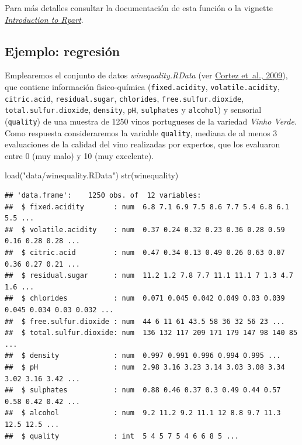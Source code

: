 \documentclass[
  spanish,
]{book}
\newenvironment{Shaded}{\begin{snugshade}}{\end{snugshade}}
\newcommand{\FunctionTok}[1]{\textcolor[rgb]{0.00,0.00,0.00}{#1}}
\newcommand{\NormalTok}[1]{#1}
\newcommand{\StringTok}[1]{\textcolor[rgb]{0.31,0.60,0.02}{#1}}
\theoremstyle{break}
\theoremstyle{definition}
\theoremstyle{definition}
\theoremstyle{definition}
\theoremstyle{definition}
\theoremstyle{remark}
\begin{document}
Para más detalles consultar la documentación de esta función o la vignette \href{https://cran.r-project.org/web/packages/rpart/vignettes/longintro.pdf}{\emph{Introduction to Rpart}}.

\hypertarget{ejemplo-regresiuxf3n}{%
\subsection{Ejemplo: regresión}\label{ejemplo-regresiuxf3n}}

Emplearemos el conjunto de datos \emph{winequality.RData} (ver \protect\hyperlink{ref-cortez2009modeling}{Cortez et~al., 2009}), que contiene información fisico-química
(\texttt{fixed.acidity}, \texttt{volatile.acidity}, \texttt{citric.acid}, \texttt{residual.sugar}, \texttt{chlorides}, \texttt{free.sulfur.dioxide},
\texttt{total.sulfur.dioxide}, \texttt{density}, \texttt{pH}, \texttt{sulphates} y \texttt{alcohol}) y sensorial (\texttt{quality})
de una muestra de 1250 vinos portugueses de la variedad \emph{Vinho Verde}.
Como respuesta consideraremos la variable \texttt{quality}, mediana de al menos 3 evaluaciones de la calidad del vino
realizadas por expertos, que los evaluaron entre 0 (muy malo) y 10 (muy excelente).

\begin{Shaded}
\begin{Highlighting}[]
\FunctionTok{load}\NormalTok{(}\StringTok{"data/winequality.RData"}\NormalTok{)}
\FunctionTok{str}\NormalTok{(winequality)}
\end{Highlighting}
\end{Shaded}

\begin{verbatim}
## 'data.frame':    1250 obs. of  12 variables:
##  $ fixed.acidity       : num  6.8 7.1 6.9 7.5 8.6 7.7 5.4 6.8 6.1 5.5 ...
##  $ volatile.acidity    : num  0.37 0.24 0.32 0.23 0.36 0.28 0.59 0.16 0.28 0.28 ...
##  $ citric.acid         : num  0.47 0.34 0.13 0.49 0.26 0.63 0.07 0.36 0.27 0.21 ...
##  $ residual.sugar      : num  11.2 1.2 7.8 7.7 11.1 11.1 7 1.3 4.7 1.6 ...
##  $ chlorides           : num  0.071 0.045 0.042 0.049 0.03 0.039 0.045 0.034 0.03 0.032 ...
##  $ free.sulfur.dioxide : num  44 6 11 61 43.5 58 36 32 56 23 ...
##  $ total.sulfur.dioxide: num  136 132 117 209 171 179 147 98 140 85 ...
##  $ density             : num  0.997 0.991 0.996 0.994 0.995 ...
##  $ pH                  : num  2.98 3.16 3.23 3.14 3.03 3.08 3.34 3.02 3.16 3.42 ...
##  $ sulphates           : num  0.88 0.46 0.37 0.3 0.49 0.44 0.57 0.58 0.42 0.42 ...
##  $ alcohol             : num  9.2 11.2 9.2 11.1 12 8.8 9.7 11.3 12.5 12.5 ...
##  $ quality             : int  5 4 5 7 5 4 6 6 8 5 ...
\end{verbatim}
\end{document}
